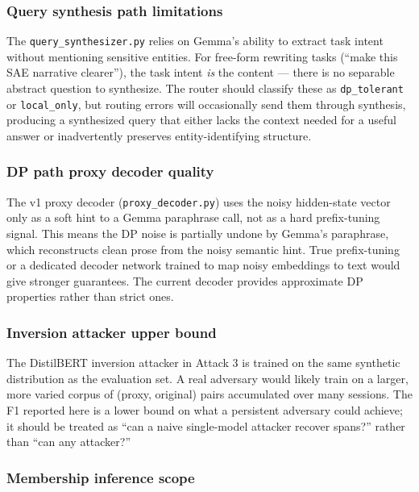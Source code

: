 \subsubsection{Query synthesis path
limitations}\label{query-synthesis-path-limitations}

The \texttt{query\_synthesizer.py} relies on Gemma's ability to extract
task intent without mentioning sensitive entities. For free-form
rewriting tasks (``make this SAE narrative clearer''), the task intent
\emph{is} the content --- there is no separable abstract question to
synthesize. The router should classify these as \texttt{dp\_tolerant} or
\texttt{local\_only}, but routing errors will occasionally send them
through synthesis, producing a synthesized query that either lacks the
context needed for a useful answer or inadvertently preserves
entity-identifying structure.

\subsubsection{DP path proxy decoder
quality}\label{dp-path-proxy-decoder-quality}

The v1 proxy decoder (\texttt{proxy\_decoder.py}) uses the noisy
hidden-state vector only as a soft hint to a Gemma paraphrase call, not
as a hard prefix-tuning signal. This means the DP noise is partially
undone by Gemma's paraphrase, which reconstructs clean prose from the
noisy semantic hint. True prefix-tuning or a dedicated decoder network
trained to map noisy embeddings to text would give stronger guarantees.
The current decoder provides approximate DP properties rather than
strict ones.

\subsubsection{Inversion attacker upper
bound}\label{inversion-attacker-upper-bound}

The DistilBERT inversion attacker in Attack 3 is trained on the same
synthetic distribution as the evaluation set. A real adversary would
likely train on a larger, more varied corpus of (proxy, original) pairs
accumulated over many sessions. The F1 reported here is a lower bound on
what a persistent adversary could achieve; it should be treated as ``can
a naive single-model attacker recover spans?'' rather than ``can any
attacker?''

\subsubsection{Membership inference
scope}\label{membership-inference-scope}

